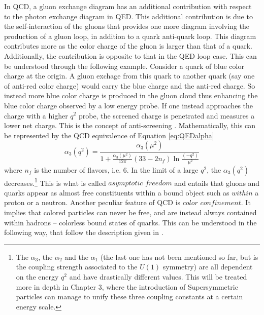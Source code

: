 \noindent\justify
In QCD, a gluon exchange diagram has an additional contribution with respect to the photon exchange diagram in QED. 
This additional contribution is due to the self-interaction of the gluons that provides one more diagram involving the production of a gluon loop, in addition to a quark anti-quark loop. 
This diagram contributes more as the color charge of the gluon is larger than that of a quark. 
Additionally, the contribution is opposite to that in the QED loop case. 
This can be understood through the following example. Consider a quark of blue color charge at the origin. 
A gluon exchage from this quark to another quark (say one of anti-red color charge) would carry the blue charge and the anti-red charge. 
So instead more blue color charge is produced in the gluon cloud thus enhancing the blue color charge observed by a low energy probe. 
If one instead approaches the charge with a higher $q^{2}$ probe, the screened charge is penetrated and measures a lower net charge.
This is the concept of anti-screening \cite{Kane:2244793}.
Mathematically, this can be represented by the QCD equivalence of Equation \ref{eq:QEDalpha} 
\begin{equation}
\alpha_{3}(q^{2})=\frac{\alpha_{3}(\mu^{2})}{1+\frac{\alpha_{3}(\mu^{2})}{12\pi}(33-2 n_{f})\ln\frac{(-q^{2})}{\mu^{2}}}
\end{equation}
where $n_{f}$ is the number of flavors, i.e. 6. 
In the limit of a large $q^{2}$, the $\alpha_{3}(q^{2})$ decreases.\footnote{The $\alpha_{3}$, the $\alpha_{2}$ and the $\alpha_{1}$ (the last one has not been mentioned so far, but is the coupling strength associated to the $U(1)$ symmetry) are all dependent on the energy $q^{2}$ and have drastically different values. This will be treated more in depth in Chapter 3, where the introduction of Supersymmetric particles can manage to unify these three coupling constants at a certain energy scale.} 
This is what is called $asymptotic$ $freedom$ \cite{Gross:1973id,Politzer:1973fx} and entails that gluons and quarks appear as almost free constituents within a bound object such as $within$ a proton or a neutron. 
\newpara
\noindent\justify
Another peculiar feature of QCD is $color$ $confinement$. 
It implies that colored particles can never be free, and are instead always contained within hadrons -- colorless bound states of quarks. 
This can be understood in the following way, that follow the description given in \cite{Kane:2244793}. 
